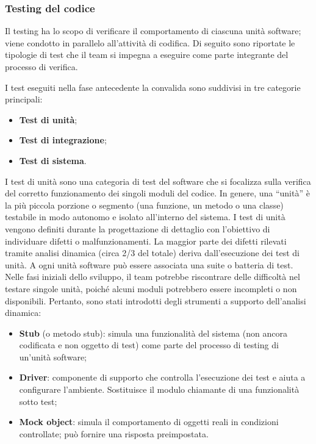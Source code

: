 \subsubsection{Testing del codice}\label{testing-codice}
\par Il testing ha lo scopo di verificare il comportamento di ciascuna unità software; viene condotto in parallelo all'attività di codifica. Di seguito sono riportate le tipologie di test che il team si impegna a eseguire come parte integrante del processo di verifica.

\par I test eseguiti nella fase antecedente la convalida sono suddivisi in tre categorie principali:
\begin{itemize}
  \item \textbf{Test di unità};
  \item \textbf{Test di integrazione};
  \item \textbf{Test di sistema}.
\end{itemize}

\par I test di unità sono una categoria di test del software che si focalizza sulla verifica del corretto funzionamento dei singoli moduli del codice. In genere, una “unità” è la più piccola porzione o segmento (una funzione, un metodo o una classe) testabile in modo autonomo e isolato all’interno del sistema. I test di unità vengono definiti durante la progettazione di dettaglio con l’obiettivo di individuare difetti o malfunzionamenti. La maggior parte dei difetti rilevati tramite analisi dinamica (circa 2/3 del totale) deriva dall’esecuzione dei test di unità. A ogni unità software può essere associata una suite o batteria di test. Nelle fasi iniziali dello sviluppo, il team potrebbe riscontrare delle difficoltà nel testare singole unità, poiché alcuni moduli potrebbero essere incompleti o non disponibili. Pertanto, sono stati introdotti degli strumenti a supporto dell'analisi dinamica:
\begin{itemize}
  \item \textbf{Stub} (o metodo stub): simula una funzionalità del sistema (non ancora codificata e non oggetto di test) come parte del processo di testing di un’unità software;
  \item \textbf{Driver}: componente di supporto che controlla l'esecuzione dei test e aiuta a configurare l'ambiente. Sostituisce il modulo chiamante di una funzionalità sotto test;
  \item \textbf{Mock object}: simula il comportamento di oggetti reali in condizioni controllate; può fornire una risposta preimpostata.
\end{itemize}

